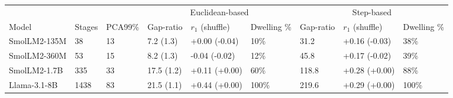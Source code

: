 \begin{tabular}{lllllllll}
\toprule
 &  &  & \multicolumn{3}{c}{Euclidean-based} & \multicolumn{3}{c}{Step-based} \\
\cmidrule(lr){4-6} \cmidrule(lr){7-9}
Model & {\small Stages} & {\footnotesize PCA99\%} & Gap-ratio & $r_1$ {\small (shuffle)} & Dwelling \% & Gap-ratio & $r_1$ {\small (shuffle)} & Dwelling \% \\
\midrule
SmolLM2-135M & 38 & 13 & 7.2 {\small (1.3)} & +0.00 {\small (-0.04)} & 10\% & 31.2 & +0.16 {\small (-0.03)} & 38\% \\
SmolLM2-360M & 53 & 15 & 8.2 {\small (1.3)} & -0.04 {\small (-0.02)} & 12\% & 45.8 & +0.17 {\small (-0.02)} & 39\% \\
SmolLM2-1.7B & 335 & 33 & 17.5 {\small (1.2)} & +0.11 {\small (+0.00)} & 60\% & 118.8 & +0.28 {\small (+0.00)} & 88\% \\
Llama-3.1-8B & 1438 & 83 & 21.5 {\small (1.1)} & +0.44 {\small (+0.00)} & 100\% & 219.6 & +0.29 {\small (+0.00)} & 100\% \\
\bottomrule
\end{tabular}
